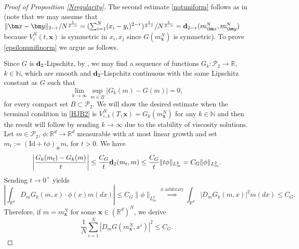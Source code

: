 \documentclass[reqno,11pt]{amsart}
\numberwithin{equation}{section}
\newcommand{\R}{\mathbb{R}} %
\newcommand{\e}{\varepsilon}
\newcommand{\nd}{\noindent}
\begin{document}
\begin{proof}[Proof of Proposition \ref{Nregularity}]
The second estimate \eqref{notuniform} follows as in \cite[Theorem 3.3]{gangbo2021finite} (note that we may assume that $\|\bm x-\bm y\|_{2-r}/N^{\frac{1}{2-r}}=(\sum_{i=1}^N(x_i-y_i)^{2-r})^{\frac{1}{2-r}}/N^{\frac{1}{2-r}}={\bf d}_{2-r}(m^N_{\bm x},m^N_{\bm y})$ because $V^N_\e(t,\bm x)$ is symmetric in $x_i,x_j$ since $G(m^N_{\bm x})$ is symmetric). To prove \eqref{epsilonunifinorm} we argue as follows.
\vspace{1mm}

\nd
Since $G$ is ${\bf d}_2$-Lipschitz, by  \cite[Theorem 4.2]{cosso2023smooth}, we may find a sequence of functions $G_{k}\colon\mathcal{P}_2\to \R$, $k\in\mathbb{N}$, which are smooth and ${\bf d}_2$-Lispchitz continuous with the same Lipschitz constant as $G$ such that
$$\lim_{k\to \infty}\sup_{m\in B}|G_k(m)-G(m)|=0,$$
for every compact set $B\subset\mathcal{P}_2$. We will show the desired estimate when the terminal condition in \eqref{HJB2} is $V^N_{\e,k}(T,\bm x)=G_k(m^N_{\bm x})$ for any $k\in\mathbb{N}$ and then the result will follow by sending $k\to \infty$ due to the stability of viscosity solutions.
Let $m\in \mathcal{P}_2$, $\phi:\R^d\to \R^d$ measurable with at most linear growth and set $m_t:=(\text{Id}+t\phi)_\#m$, for $t>0$. We have
\begin{align*}
    \left|\frac{G_k(m_t)-G_k(m)}{t}\right|\le \frac{C_G}{t}{\bf d}_2(m_t,m)\le \frac{C_G}{t}\|t\phi\|_{L^2_m}=C_G\|\phi\|_{L^2_m}.
\end{align*}
Sending $t\to 0^+$ yields
$$\left|\int_{\R^d} D_mG_k(m,x)\cdot \phi(x) m(dx)\right|\le C_G\|\phi\|_{L^2_m}\stackrel{\phi\text{ arbitrary}}{\implies} \int_{\R^d}|D_mG_k(m,x)|^2m(dx)\le C_G.$$
Therefore, if $m=m^N_{\bm x}$ for some $\bm x\in (\R^d)^N$, we derive
$$\frac{1}{N}\sum_{i=1}^N|D_mG(m^N_{\bm x},x^i)|^2\le C_G.$$



\end{proof}
\end{document}
